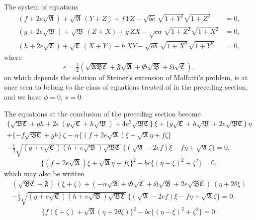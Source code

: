 \documentclass[11pt]{article}
\begin{document}
The system of equations
\begin{align*}
(f+2e\sqrt{\mathfrak{A}}) + \sqrt{\mathfrak{A}}\,(Y+Z) + f\,YZ - \sqrt{bc}\,\sqrt{1+Y^2}\sqrt{1+Z^2} &= 0,\\
(g+2e\sqrt{\mathfrak{B}}) + \sqrt{\mathfrak{B}}\,(Z+X) + g\,ZX - \sqrt{ca}\,\sqrt{1+Z^2}\sqrt{1+X^2} &= 0,\\
(h+2e\sqrt{\mathfrak{C}}) + \sqrt{\mathfrak{C}}\,(X+Y) + h\,XY - \sqrt{ab}\,\sqrt{1+X^2}\sqrt{1+Y^2} &= 0,
\end{align*}
where
\[
e = \tfrac{1}{2}(\sqrt{\mathfrak{A}\mathfrak{B}\mathfrak{C}} + \mathfrak{F}\sqrt{\mathfrak{A}} + \mathfrak{G}\sqrt{\mathfrak{B}} + \mathfrak{H}\sqrt{\mathfrak{C}}),
\]
on which depends the solution of Steiner's extension of Malfatti's problem, is at once seen to belong to the class of equations treated of in the preceding section, and we have $\phi=0$, $s=0$.

The equations at the conclusion of the preceding section become
\begin{multline*}
\{\sqrt{\mathfrak{B}\mathfrak{C}}+gh+2e\,(g\sqrt{\mathfrak{C}}+h\sqrt{\mathfrak{B}})+4e^2\sqrt{\mathfrak{B}\mathfrak{C}}\}\,\xi + \{g\sqrt{\mathfrak{C}}+h\sqrt{\mathfrak{B}}+2e\sqrt{\mathfrak{B}\mathfrak{C}}\}\,\eta\\
+ \{-f\sqrt{\mathfrak{B}\mathfrak{C}}+gh\}\,\zeta - \alpha\{(f+2e\sqrt{\mathfrak{A}})\xi+\sqrt{\mathfrak{A}}\eta+f\zeta\}\\
- \tfrac{1}{2}\sqrt{(g+e\sqrt{\mathfrak{C}})(h+e\sqrt{\mathfrak{B}})\sqrt{\mathfrak{B}\mathfrak{C}}}\,\{(\sqrt{\mathfrak{A}}-2e f)\xi - f\eta + \sqrt{\mathfrak{A}}\zeta\} = 0,
\end{multline*}
\[
\{(f+2e\sqrt{\mathfrak{A}})\xi+\sqrt{\mathfrak{A}}\eta+f\zeta\}^2 - bc\{(\eta-\xi)^2+\zeta^2\} = 0,
\]
which may also be written
\begin{multline*}
(\sqrt{\mathfrak{B}\mathfrak{C}}+\mathfrak{F})\,(\xi+\zeta) + (-\alpha\sqrt{\mathfrak{A}}+\mathfrak{G}\sqrt{\mathfrak{C}}+\mathfrak{H}\sqrt{\mathfrak{B}}+2e\sqrt{\mathfrak{B}\mathfrak{C}})\,(\eta+2\theta\xi)\\
- \tfrac{1}{2}\sqrt{(g+e\sqrt{\mathfrak{C}})(h+e\sqrt{\mathfrak{B}})\sqrt{\mathfrak{B}\mathfrak{C}}}\,\{(\sqrt{\mathfrak{A}}-2e f)\xi - f\eta + \sqrt{\mathfrak{A}}\zeta\} = 0,
\end{multline*}
\[
\{f(\xi+\zeta)+\sqrt{\mathfrak{A}}(\eta+2\theta\xi)\}^2 - bc\{(\eta-\xi)^2+\zeta^2\} = 0.
\]
\end{document}
